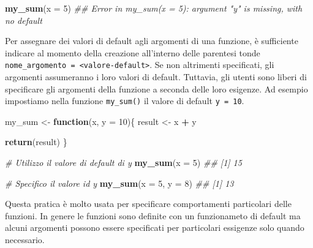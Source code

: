 \documentclass[
]{book}
\newenvironment{Shaded}{\begin{snugshade}}{\end{snugshade}}
\newcommand{\CommentTok}[1]{\textcolor[rgb]{0.56,0.35,0.01}{\textit{#1}}}
\newcommand{\ControlFlowTok}[1]{\textcolor[rgb]{0.13,0.29,0.53}{\textbf{#1}}}
\newcommand{\DataTypeTok}[1]{\textcolor[rgb]{0.13,0.29,0.53}{#1}}
\newcommand{\DecValTok}[1]{\textcolor[rgb]{0.00,0.00,0.81}{#1}}
\newcommand{\KeywordTok}[1]{\textcolor[rgb]{0.13,0.29,0.53}{\textbf{#1}}}
\newcommand{\NormalTok}[1]{#1}
\newcommand{\OperatorTok}[1]{\textcolor[rgb]{0.81,0.36,0.00}{\textbf{#1}}}
\newcommand{\StringTok}[1]{\textcolor[rgb]{0.31,0.60,0.02}{#1}}
\begin{document}
\begin{Shaded}
\begin{Highlighting}[]
\KeywordTok{my_sum}\NormalTok{(}\DataTypeTok{x =} \DecValTok{5}\NormalTok{)}
\CommentTok{## Error in my_sum(x = 5): argument "y" is missing, with no default}
\end{Highlighting}
\end{Shaded}

Per assegnare dei valori di default agli argomenti di una funzione, è sufficiente indicare al momento della creazione all'interno delle parentesi tonde \texttt{nome\_argomento\ =\ \textless{}valore-default\textgreater{}}. Se non altrimenti specificati, gli argomenti assumeranno i loro valori di default. Tuttavia, gli utenti sono liberi di specificare gli argomenti della funzione a seconda delle loro esigenze. Ad esempio impostiamo nella funzione \texttt{my\_sum()} il valore di default \texttt{y\ =\ 10}.

\begin{Shaded}
\begin{Highlighting}[]
\NormalTok{my_sum <-}\StringTok{ }\ControlFlowTok{function}\NormalTok{(x, }\DataTypeTok{y =} \DecValTok{10}\NormalTok{)\{}
\NormalTok{  result <-}\StringTok{ }\NormalTok{x }\OperatorTok{+}\StringTok{ }\NormalTok{y}
  
  \KeywordTok{return}\NormalTok{(result)}
\NormalTok{\}}

\CommentTok{# Utilizzo il valore di default di y}
\KeywordTok{my_sum}\NormalTok{(}\DataTypeTok{x =} \DecValTok{5}\NormalTok{)}
\CommentTok{## [1] 15}

\CommentTok{# Specifico il valore id y}
\KeywordTok{my_sum}\NormalTok{(}\DataTypeTok{x =} \DecValTok{5}\NormalTok{,  }\DataTypeTok{y =} \DecValTok{8}\NormalTok{)}
\CommentTok{## [1] 13}
\end{Highlighting}
\end{Shaded}

Questa pratica è molto usata per specificare comportamenti particolari delle funzioni. In genere le funzioni sono definite con un funzionameto di default ma alcuni argomenti possono essere specificati per particolari essigenze solo quando necessario.
\end{document}
